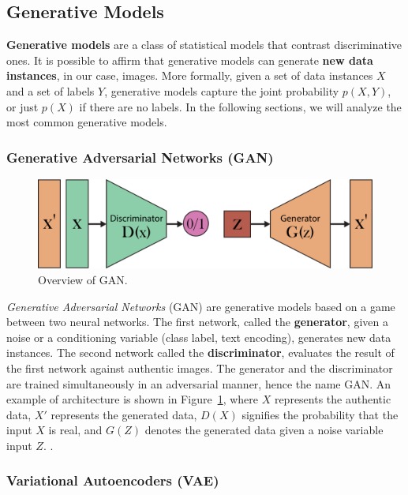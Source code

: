 \documentclass[preprint]{elsarticle}
\begin{document}
\subsection{Generative Models} \label{sec:imggenmodels}
\textbf{Generative models} are a class of statistical models that contrast discriminative ones. 
It is possible to affirm that generative models can generate \textbf{new data instances}, 
in our case, images. 
More formally, given a set of data instances $X$ and a set of labels $Y$, 
generative models capture the joint probability $p(X, Y)$, or just $p(X)$ if there are no labels. 
In the following sections, we will analyze the most common generative models.


\subsubsection{Generative Adversarial Networks (GAN)}\label{sec:gan}

\begin{figure}[b]
	\centering
    \includegraphics[scale=0.8]{img/svg/GAN.png}
	\caption{Overview of GAN.}\label{fig:gan}
\end{figure}

\emph{Generative Adversarial Networks} (GAN) \cite{goodfellow2014generative} are generative models based on a game between two neural networks. 
The first network, called the \textbf{generator}, given a noise or a conditioning variable (class label, text encoding), generates new data instances. 
The second network called the \textbf{discriminator}, evaluates the result of the first network against authentic images.
The generator and the discriminator are trained simultaneously in an adversarial manner, hence the name GAN. An example of architecture is shown in Figure~\ref{fig:gan}, where $X$ represents the authentic data, $X'$ represents the generated data, $D(X)$ signifies the probability that the input $X$ is real, and $G(Z)$ denotes the generated data given a noise variable input $Z$.
\cite{weng2019gan}.

\subsubsection{Variational Autoencoders (VAE)} \label{sec:vae}
\end{document}
